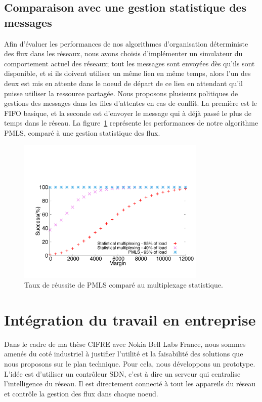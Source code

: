 \documentclass{article}
\begin{document}
\subsection{Comparaison avec une gestion statistique des messages}
Afin d'évaluer les performances de nos algorithmes d'organisation déterministe des flux dans les réseaux, nous avons choisis d'implémenter un simulateur du comportement actuel des réseaux; tout les messages sont envoyées dès qu'ils sont disponible, et si ils doivent utiliser un même lien en même temps, alors l'un des deux est mis en attente dans le noeud de départ de ce lien en attendant qu'il puisse utiliser la ressource partagée. Nous proposons plusieurs politiques de gestions des messages dans les files d'attentes en cas de conflit. La première est le FIFO basique, et la seconde est d'envoyer le message qui à déjà passé le plus de temps dans le réseau.
La figure~\ref{fig:sto} représente les performances de notre algorithme PMLS, comparé à une gestion statistique des flux.
 \begin{figure}
       \begin{center}
      \includegraphics[width = 0.8\textwidth]{stochastic.pdf}
      \end{center}
      \caption{Taux de réussite de PMLS comparé au multiplexage statistique.}
      \label{fig:sto}   
     \end{figure}    
\section{Intégration du travail en entreprise}
Dans le cadre de ma thèse CIFRE avec Nokia Bell Labs France, nous sommes amenés du coté industriel à justifier l'utilité et la faisabilité des solutions que nous proposons sur le plan technique.
Pour cela, nous développons un prototype. L'idée est d'utiliser un contrôleur SDN, c'est à dire un serveur qui centralise l'intelligence du réseau. Il est directement connecté à tout les appareils du réseau et contrôle la gestion des flux dans chaque noeud. 
\end{document}
